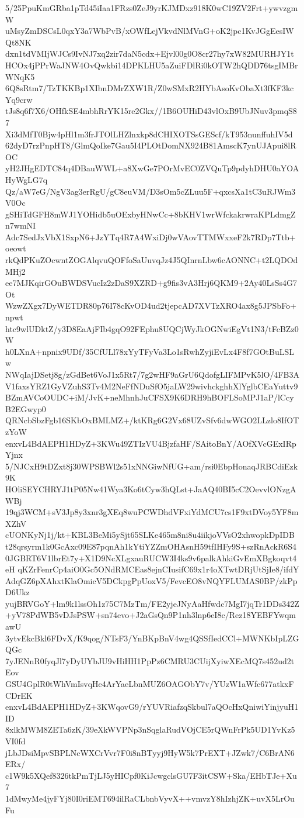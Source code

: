 5/25PpuKmGRba1pTd45iIaa1FRzs0ZeJ9yrKJMDxz918K0wC19ZV2Frt+ywvzgmW
uMsyZmDSCsL0qxY3a7WbPvB/xOWfLejVkvdNlMVnG+oK2jpc1KvJGgEesIWQt8NK
dxn1tdVMIjWJCs9IvNJ7xq2zir7daN5cdx+Ejvl00g0O8cr27hy7xW82MURHJY1t
HCOx4jPPrWaJNW4OvQwkbi14DPKLHU5aZuiFDlRi0kOTW2hQDD76tsgIMBrWNqK5
6Q8sRtm7/TzTKKBp1XIbnDMrZXW1R/Z0wSMxR2HYbAsoKvObaXt3fKF3kcYq9crw
tJs8q6f7X6/OHfkSE4mbhRrYK15re2Gkx//1B6OUHiD43vlOxB9UbJNuv3pmqS87
Xi3dMfT0Bjw4pHl1m3frJTOlLHZlnxkp8dCHIXOTSsGEScf/kT953nunffuhIV5d
62dyD7rzPnpHT8/GlmQoIke7Gau5I4PLOtDomNX924B81AmscK7ynUJApui8lROC
yH2JHgEDTC84q4DBauWWL+a8XwGe7POrMvEC0ZVQuTp9pdyhDHU0aYOAHyWgLG7q
Qz/aW7eG/NgV3ag3erRgU/gC8euVM/D3sOm5cZLuu5F+qxcsXa1tC3uRJWm3V0Oc
gSHiTdGFH8mWJ1YOHidb5uOExbyHNwCc+8bKHV1wrWfckakrwraKPLdmgZn7wmNI
Adc7SedJxVbX1SxpN6+JzYTq4R7A4WxiDj0wVAovTTMWxxeF2k7RDp7Ttb+oeowt
rkQdPKuZOcwntZOGAlqvuQOFfoSaUuvqJz4J5QInrnLbw6cAONNC+t2LQDOdMHj2
ee7MJKqirGOuBWDSVucIz2zDaS9XZRD+g9fis3vA3Hrj6QKM9+2Ay40LsSs4G7Ot
WzwZXgx7DyWETDR80p76I78cKvOD4ud2tjepcAD7XVTzXRO4ax8g5JPSbFo+npwt
htc9wlUDktZ/y3D8EaAjFIb4gqO92FEphu8UQCjWyJkOGNwiEgVt1N3/tFcBZz0W
h0LXnA+npnix9UDf/35CfULl78xYyTFyVa3Lo1sRwhZyjiEvLx4F8f7GOtBuLSLw
NWqIajDSetj8g/zGdBet6VoJ1x5Rt7/7g2wHF9aGrU6QdofgLIFMPvK5lO/4FB3A
V1faxsYRZ1GyVZuhS3Tv4M2NeFfNDuSfO5jaLW29wivhckghhXlYglbCEaYuttv9
BZmAVCoOUDC+iM/JvK+neMhnhJuCFSX9K6DRH9hBOFLSoMPJ1aP/lCcyB2EGwyp0
QRNcbSbzFgb16SKbOxBMLMZ+/ktKRg6G2Vx68UZvSfv6dwWGO2LLzlo8IfOTzYoW
enxvL4BdAEPH1HDyZ+3KWu49ZTIzVU4BjzfaHF/SAitoBnY/AOfXVcGExIRpYjnx
5/NJCxH9tDZxt8j30WPSBWl2s51xNNGiwNfUG+am/rsi0EbpHonaqJRBCdiEzk9K
HOliSEYCHRYJ1tP05Nw41Wya3Ko6tCyw3hQLst+JaAQ40BI5cC2OevvlONzgAWBj
19qj3WCM+sV3Jp8y3xnr3gXEq8wuPCWDhdVFxiYdMCU7cs1F9xtDVoy5YF8mXZhV
cUONKyNj1j/kt+KBL3BeMi5ySjt65SLKe465m8ni8u4iikjoVVsO2xhwopkDpIDB
t28qrsyrm1k0GcAxc09E87pqnAh1kYtiYZZmOHAsnH59tfIHFy9S+szRnAckR6S4
0JGBRT6V1lbrEt7y+X1D9NcXLgxauRUCW3I4ks9v6palkAhkiGvEmXBgkoqvt4eH
qKZrFenrCp4aiO0Gc5ONdRMCEas8ejnCIusifC69x1r4oXTwtDRjUtSjIe8/ifdY
AdqGZ6pXAhxtKlaOmicV5DCkpgPpUoxV5/FevcEO8vNQYFLUMAS0BP/zkPpD6Ukz
yujBRVGoY+lm9k1lssOh1z75C7MzTm/FE2yjeJNyAaHfwdc7MgI7jqTr1DDs342Z
+yV78PdWB5vDJsPSW+sn74evo+J2aGsQn9P1nh3lnp6eI8c/Rez18YEBFYwqmawU
3ytvEkcBkl6FDvX/K9qog/NTsF3/YnBKpBnV4wg4QSSfIedCCl+MWNKbIpLZGQGc
7yJENnR0fyqJl7yDyUYbJU9vHiHH1PpPz6CMRU3CUijXyiwXEcMQ7s452ud2tEov
GSU4GplR0tWhVmIsvqHe4ArYaeLbnMUZ6OAGObY7v/YUzW1aWfc677atkxFCDrEK
enxvL4BdAEPH1HDyZ+3KWqovG9/rYUVRiafzqSkbul7aQOcHxQniwiYinjyuH1ID
8xlkMWM8ZETa6zK/39eXkWVPNp3nSqglaRudVOjCE5rQWnFrPk5UD1YvKz5VI0fd
jLbJDsiMpvSBPLNcWXCrVvr7F0i8nBTyyj9HyW5k7PrEXT+JZwk7/C6BrAN6ERx/
c1W9k5XQef8326tkPmTjLJ5yHICpf0KiJcwgclsGU7F3itCSW+Ska/EHbTJe+Xu7
1dMwyMe4jyFYj80I0riEMT694ilRaCLbnbVyvX++vmvzY8hIzhjZK+uvX5LrOuFu

